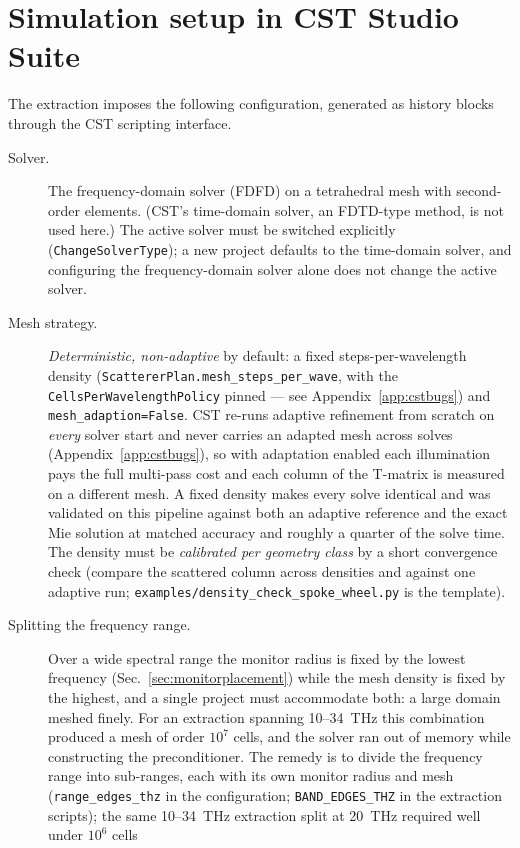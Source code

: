 \documentclass[11pt]{article}
\begin{document}
\section{Simulation setup in CST Studio Suite}
\label{sec:cstsetup}
The extraction imposes the following configuration, generated as history
blocks through the CST scripting interface.
\begin{description}
\item[Solver.]  The frequency-domain solver (FDFD) on a tetrahedral
mesh with second-order elements.  (CST's time-domain solver, an
FDTD-type method, is not used here.)  The active solver must be
switched explicitly (\texttt{ChangeSolverType}); a new project defaults
to the time-domain solver, and configuring the frequency-domain solver
alone does not change the active solver.
\item[Mesh strategy.]  \emph{Deterministic, non-adaptive} by default: a
fixed steps-per-wavelength density
(\texttt{ScattererPlan.mesh\_steps\_per\_wave}, with the
\texttt{CellsPerWavelengthPolicy} pinned --- see
Appendix~\ref{app:cstbugs}) and \texttt{mesh\_adaption=False}.  CST
re-runs adaptive refinement from scratch on \emph{every} solver start
and never carries an adapted mesh across solves
(Appendix~\ref{app:cstbugs}), so with adaptation enabled each
illumination pays the full multi-pass cost and each column of the
T-matrix is measured on a different mesh.  A fixed density makes every
solve identical and was validated on this pipeline against both an
adaptive reference and the exact Mie solution at matched accuracy and
roughly a quarter of the solve time.  The density must be
\emph{calibrated per geometry class} by a short convergence check
(compare the scattered column across densities and against one adaptive
run; \texttt{examples/density\_check\_spoke\_wheel.py} is the template).
\item[Splitting the frequency range.]  Over a wide spectral range the
monitor radius is fixed by the lowest frequency
(Sec.~\ref{sec:monitorplacement}) while the mesh density is fixed by
the highest, and a single project must accommodate both: a large
domain meshed finely.  For an extraction spanning 10--34~THz this
combination produced a mesh of order $10^7$ cells, and the solver ran
out of memory while constructing the preconditioner.  The remedy is to
divide the frequency range into sub-ranges, each with its own monitor
radius and mesh (\texttt{range\_edges\_thz} in the configuration;
\texttt{BAND\_EDGES\_THZ} in the extraction scripts); the same
10--34~THz extraction split at 20~THz required well under $10^6$ cells

\end{description}
\end{document}
